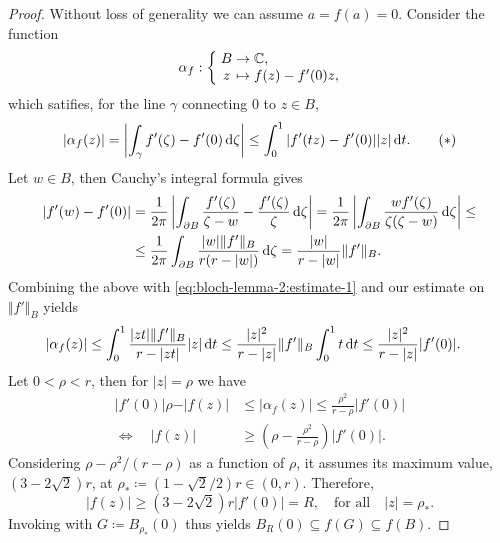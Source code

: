 \begin{proof}
    Without loss of generality we can assume $a = f(a) = 0$. Consider the function
    $$ \mapping{\alpha_f}{B & \to & \C,}{z & \mapsto & f(z) - f'(0) z,} $$
    which satifies, for the line $\gamma$ connecting $0$ to $z \in B$,
    \begin{equation} \label{eq:bloch-lemma-2:estimate-1}
        \vert \alpha_f(z) \vert = \left\vert \int_\gamma f'(\zeta) - f'(0) \mathop{}\!\mathrm{d} \zeta \right\vert \leq \int_0^1 \vert f'(t z) - f'(0) \vert \vert z \vert \mathop{}\!\mathrm{d} t. \tag{\textasteriskcentered}
    \end{equation}
    Let $w \in B$, then Cauchy's integral formula gives
    \begin{align*}
        \vert f'(w) - f'(0) \vert &= \frac{1}{2\pi} \left\vert \int_{\partial B} \frac{f'(\zeta)}{\zeta - w} - \frac{f'(\zeta)}{\zeta} \mathop{}\!\mathrm{d} \zeta \right\vert = \frac{1}{2\pi} \left\vert \int_{\partial B} \frac{w f'(\zeta)}{\zeta (\zeta - w)} \mathop{}\!\mathrm{d} \zeta \right\vert \leq \\
        &\leq \frac{1}{2\pi} \int_{\partial B} \frac{\vert w \vert \Vert f' \Vert_B}{r(r - \vert w \vert)} \mathop{}\!\mathrm{d} \zeta = \frac{\vert w \vert}{r - \vert w \vert} \Vert f' \Vert_B.
    \end{align*}
    Combining the above with \eqref{eq:bloch-lemma-2:estimate-1} and our estimate on $\Vert f' \Vert_B$ yields
    \begin{align*}
        \vert \alpha_f(z) \vert &\leq \int_0^1 \frac{\vert z t \vert \Vert f' \Vert_B}{r - \vert z t \vert} \vert z \vert \mathop{}\!\mathrm{d} t \leq \frac{\vert z \vert^2}{r - \vert z \vert} \Vert f' \Vert_B \int_0^1 t \mathop{}\!\mathrm{d} t \leq \frac{\vert z \vert^2}{r - \vert z \vert} \vert f'(0) \vert.
    \end{align*}
    Let $0 < \rho < r$, then for $\vert z \vert = \rho$ we have
    \begin{align*}
        \vert f'(0) \vert \rho - \vert f(z) \vert &\leq \vert \alpha_f(z) \vert \leq \frac{\rho^2}{r - \rho} \vert f'(0) \vert \\
        \Longleftrightarrow \quad \vert f(z) \vert &\geq \left( \rho - \frac{\rho^2}{r - \rho} \right) \vert f'(0) \vert.
    \end{align*}
    Considering $\rho - \rho^2 / (r - \rho)$ as a function of $\rho$, it assumes its maximum value, $(3 - 2 \sqrt{2}) r$, at $\rho_* \coloneqq (1 - \sqrt{2} / 2)r \in (0, r)$. Therefore,
    \begin{equation*}
        \vert f(z) \vert \geq (3 - 2 \sqrt{2}) r \vert f'(0) \vert = R, \quad \textrm{for all} \quad \vert z \vert = \rho_*.
    \end{equation*}
    Invoking  with $G \coloneqq B_{\rho_*}(0)$ thus yields $B_{R}(0) \subseteq f(G) \subseteq f(B)$.
\end{proof}

